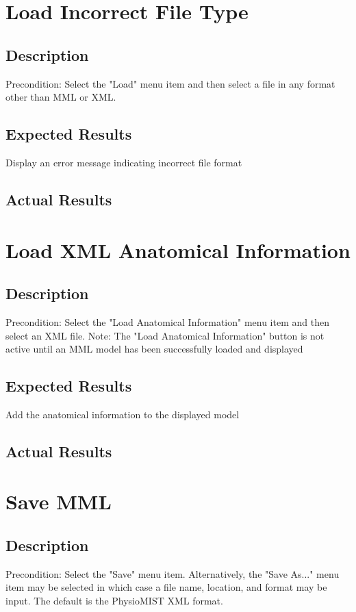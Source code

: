 \documentclass{article}
\begin{document}
\section{Load Incorrect File Type}
\subsection{Description}
Precondition: Select the "Load" menu item and then select a file in any format other than MML or XML.
\subsection{Expected Results}
Display an error message indicating incorrect file format
\subsection{Actual Results}

\section{Load XML Anatomical Information}
\subsection{Description}
Precondition: Select the "Load Anatomical Information" menu item and then select an XML file.
Note: The "Load Anatomical Information" button is not active until an MML model has been successfully loaded and displayed
\subsection{Expected Results}
Add the anatomical information to the displayed model
\subsection{Actual Results}

\section{Save MML}
\subsection{Description}
Precondition: Select the "Save" menu item.  Alternatively, the "Save As..." menu item may be selected in which case a file name, location, and format may be input.  The default is the PhysioMIST XML format.
\end{document}
